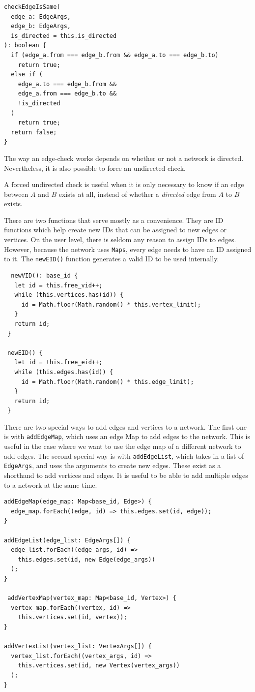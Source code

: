 \begin{verbatim}
checkEdgeIsSame(
  edge_a: EdgeArgs,
  edge_b: EdgeArgs,
  is_directed = this.is_directed
): boolean {
  if (edge_a.from === edge_b.from && edge_a.to === edge_b.to)
    return true;
  else if (
    edge_a.to === edge_b.from &&
    edge_a.from === edge_b.to &&
    !is_directed
  )
    return true;
  return false;
}
\end{verbatim}

The way an edge-check works depends on whether or not a network is directed.
Nevertheless, it is also possible to force an undirected check.

A forced undirected check is useful when it is only necessary to know
if an edge between $A$ and $B$ exists at all, 
instead of whether a \textit{directed} edge from $A$ to $B$ exists.

There are two functions that serve mostly as a convenience.
They are ID functions which help create new IDs that can be assigned to new edges or vertices.
On the user level, there is seldom any reason to assign IDs to edges.
However, because the network uses \texttt{Maps}, every edge needs to have
an ID assigned to it.
The \texttt{newEID()} function generates a valid ID to be used internally.

\begin{verbatim}
  newVID(): base_id {
   let id = this.free_vid++;
   while (this.vertices.has(id)) {
     id = Math.floor(Math.random() * this.vertex_limit);
   }
   return id;
 }
 
 newEID() {
   let id = this.free_eid++;
   while (this.edges.has(id)) {
     id = Math.floor(Math.random() * this.edge_limit);
   }
   return id;
 }
\end{verbatim}

There are two special ways to add edges and vertices to a network.
The first one is with \texttt{addEdgeMap}, which
uses an edge Map to add edges to the network.
This is useful in the case where we want to use the edge map of
a different network to add edges.
The second special way is with \texttt{addEdgeList}, which
takes in a list of \texttt{EdgeArgs}, and uses the arguments
to create new edges.
These exist as a shorthand to add vertices and edges.
It is useful to be able to add multiple edges to a network at
the same time.

\begin{verbatim}
addEdgeMap(edge_map: Map<base_id, Edge>) {
  edge_map.forEach((edge, id) => this.edges.set(id, edge));
}

addEdgeList(edge_list: EdgeArgs[]) {
  edge_list.forEach((edge_args, id) =>
    this.edges.set(id, new Edge(edge_args))
  );
}

 addVertexMap(vertex_map: Map<base_id, Vertex>) {
  vertex_map.forEach((vertex, id) =>
    this.vertices.set(id, vertex));
}

addVertexList(vertex_list: VertexArgs[]) {
  vertex_list.forEach((vertex_args, id) =>
    this.vertices.set(id, new Vertex(vertex_args))
  );
}
\end{verbatim}

